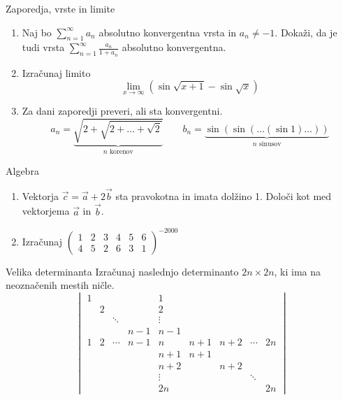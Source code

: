 \begin{frame}{Zaporedja, vrste in limite}
	\begin{enumerate}
		\item 
		Naj bo $\sum_{n = 1}^{\infty} a_n $ absolutno konvergentna vrsta in $a_n \ne -1$.
		Dokaži, da je tudi vrsta $\sum_{n=1}^\infty \frac{a_n}{1+a_n}$
		absolutno konvergentna.

		\item
		Izračunaj limito
		$$
		\lim_{x \to \infty} (\sin \sqrt{x + 1} - \sin \sqrt{x}) 
		$$
		\item
		Za dani zaporedji preveri, ali sta konvergentni.
		$$
		a_n = \underbrace{ \sqrt{2+\sqrt{2+\dots+\sqrt{2}}}}_{\text{$n$ korenov}}  \qquad
		b_n = \underbrace{ \sin(\sin(\dots(\sin 1)\dots))}_{\text{$n$ sinusov}} 
		$$
	\end{enumerate}
\end{frame}

\begin{frame}{Algebra}
	\begin{enumerate}
		\item
		Vektorja $\vec{c} = \vec{a} + 2\vec{b}  $
		sta pravokotna in imata dolžino 1. Določi kot med vektorjema $\vec{a}$ in $\vec{b}$.
		\item Izračunaj $\begin{pmatrix}
							1 & 2 & 3 & 4 & 5 & 6\\
							4 & 5 & 2 & 6 & 3 & 1
						\end{pmatrix}^{-2000}$
	\end{enumerate}
\end{frame}

\begin{frame}{Velika determinanta}
	Izračunaj naslednjo determinanto $2n \times 2n$, ki ima na neoznačenih mestih ničle.
	$$
	\begin{vmatrix}
		1 &  &  &  & 1 &  &  &  & \\
		& 2 &  &  & 2 &  &  &  & \\
		&  & \ddots  &  & \vdots  &  &  &  & \\
		&  &  & n - 1 & n - 1&  &  &  & \\
		1 & 2 & \cdots & n - 1 & n & n + 1 & n + 2 & \cdots & 2n \\
		&  &  &  & n + 1 & n + 1 &  &  & \\
		&  &  &  & n + 2 &  & n + 2 &  & \\
		&  &  &  & \vdots  &  &  & \ddots  & \\
		&  &  &  & 2n &  &  &  & 2n
	\end{vmatrix}
	$$
\end{frame}


